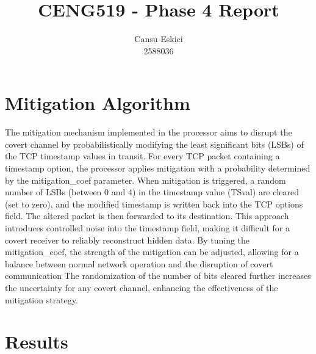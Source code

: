 \documentclass[10pt,a4paper]{article}
\title{CENG519 - Phase 4 Report}
\author{
  Cansu Eskici\\
  2588036}
\begin{document}
\maketitle
\section*{Mitigation Algorithm}

The mitigation mechanism implemented in the processor aims to disrupt the covert channel by probabilistically modifying the least significant bits (LSBs) of the TCP timestamp values in transit.
 For every TCP packet containing a timestamp option, the processor applies mitigation with a probability determined by the mitigation\_coef parameter.
  When mitigation is triggered, a random number of LSBs (between 0 and 4) in the timestamp value (TSval) are cleared (set to zero), and the modified timestamp is written back into the TCP options field. 
  The altered packet is then forwarded to its destination. This approach introduces controlled noise into the timestamp field, making it difficult for a covert receiver to reliably reconstruct hidden data. 
  By tuning the mitigation\_coef, the strength of the mitigation can be adjusted, allowing for a balance between normal network operation and the disruption of covert communication
  The randomization of the number of bits cleared further increases the uncertainty for any covert channel, enhancing the effectiveness of the mitigation strategy.

\section*{Results}
\end{document}
